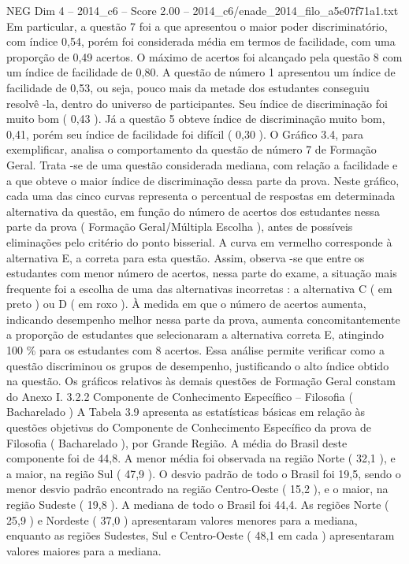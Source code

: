 \begin{textsample}{NEG Dim 4 – 2014\_c6 – Score 2.00 – 2014\_c6/enade\_2014\_filo\_a5e07f71a1.txt}
Em particular, a questão 7 foi a que apresentou o maior poder discriminatório, com índice 0,54, porém foi considerada média em termos de facilidade, com uma proporção de 0,49 acertos.
O máximo de acertos foi alcançado pela questão 8 com um índice de facilidade de 0,80.
A questão de número 1 apresentou um índice de facilidade de 0,53, ou seja, pouco mais da metade dos estudantes conseguiu resolvê -la, dentro do universo de participantes.
Seu índice de discriminação foi muito bom ( 0,43 ).
Já a questão 5 obteve índice de discriminação muito bom, 0,41, porém seu índice de facilidade foi difícil ( 0,30 ).
O Gráfico 3.4, para exemplificar, analisa o comportamento da questão de número 7 de Formação Geral.
Trata -se de uma questão considerada mediana, com relação a facilidade e a que obteve o maior índice de discriminação dessa parte da prova.
Neste gráfico, cada uma das cinco curvas representa o percentual de respostas em determinada alternativa da questão, em função do número de acertos dos estudantes nessa parte da prova ( Formação Geral/Múltipla Escolha ), antes de possíveis eliminações pelo critério do ponto bisserial.
A curva em vermelho corresponde à alternativa E, a correta para esta questão.
Assim, observa -se que entre os estudantes com menor número de acertos, nessa parte do exame, a situação mais frequente foi a escolha de uma das alternativas incorretas : a alternativa C ( em preto ) ou D ( em roxo ).
À medida em que o número de acertos aumenta, indicando desempenho melhor nessa parte da prova, aumenta concomitantemente a proporção de estudantes que selecionaram a alternativa correta E, atingindo 100 \% para os estudantes com 8 acertos.
Essa análise permite verificar como a questão discriminou os grupos de desempenho, justificando o alto índice obtido na questão.
Os gráficos relativos às demais questões de Formação Geral constam do Anexo I. 3.2.2 Componente de Conhecimento Específico – Filosofia ( Bacharelado ) A Tabela 3.9 apresenta as estatísticas básicas em relação às questões objetivas do Componente de Conhecimento Específico da prova de Filosofia ( Bacharelado ), por Grande Região.
A média do Brasil deste componente foi de 44,8.
A menor média foi observada na região Norte ( 32,1 ), e a maior, na região Sul ( 47,9 ).
O desvio padrão de todo o Brasil foi 19,5, sendo o menor desvio padrão encontrado na região Centro-Oeste ( 15,2 ), e o maior, na região Sudeste ( 19,8 ).
A mediana de todo o Brasil foi 44,4.
As regiões Norte ( 25,9 ) e Nordeste ( 37,0 ) apresentaram valores menores para a mediana, enquanto as regiões Sudestes, Sul e Centro-Oeste ( 48,1 em cada ) apresentaram valores maiores para a mediana.

\end{textsample}
